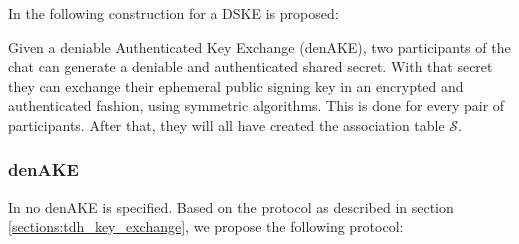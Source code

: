 In \cite{mpotr} the following construction for a DSKE is proposed:

Given a deniable Authenticated Key Exchange (denAKE), two participants of the chat can generate a deniable and authenticated shared secret. With that secret they can exchange their ephemeral public signing key in an encrypted and authenticated fashion, using symmetric algorithms. This is done for every pair of participants. After that, they will all have created the association table $\mathcal{S}$.


\subsubsection{denAKE}
In \cite{mpotr} no denAKE is specified. Based on the \tdhname protocol as described in section \ref{sections:tdh_key_exchange}, we propose the following protocol:

